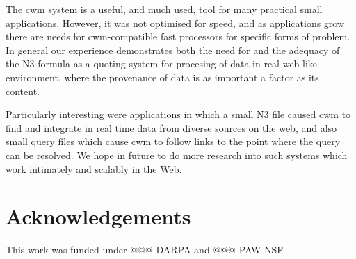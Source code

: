 \documentclass{tlp}
\begin{document}
\par The cwm system is a useful, and much used, tool for many
practical small applications. However, it was not optimised for
speed, and as applications grow there are needs for cwm-compatible
fast processors for specific forms of problem. In general our
experience demonstrates both the need for and the adequacy of the
N3 formula as a quoting system for procesing of data in real
web-like environment, where the provenance of data is as important
a factor as its content.

\par Particularly interesting were applications in which a small N3
file caused cwm to find and integrate in real time data from
diverse sources on the web, and also small query files which cause
cwm to follow links to the point where the query can be resolved.
We hope in future to do more research into such systems which work
intimately and scalably in the Web.
\section{Acknowledgements}
  

\par This work was funded under @@@ DARPA and @@@ PAW NSF


\end{document}
